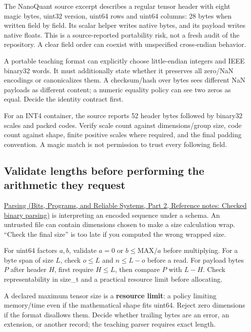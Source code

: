 The NanoQuant source excerpt describes a regular tensor header with eight magic bytes, uint32 version, uint64 rows and uint64 columns: 28 bytes when written field by field. Its scalar helper writes native bytes, and its payload writes native floats. This is a source-reported portability risk, not a fresh audit of the repository. A clear field order can coexist with unspecified cross-endian behavior.

A portable teaching format can explicitly choose little-endian integers and IEEE binary32 words. It must additionally state whether it preserves all zero/NaN encodings or canonicalizes them. A checksum/hash over bytes sees different NaN payloads as different content; a numeric equality policy can see two zeros as equal. Decide the identity contract first.

For an INT4 container, the source reports 52 header bytes followed by binary32 scales and packed codes. Verify scale count against dimensions/group size, code count against shape, finite positive scales where required, and the final padding convention. A magic match is not permission to trust every following field.

\subsection{Validate lengths before performing the arithmetic they request}\label{05-engine-i-ch002-validate-lengths-before-performing-the-arithmetic-they-request}

\hypertarget{05-engine-i-ch002-validate-lengths-before-performing-the-arithmetic-they-request}{}

\href{../01-Bits-Programs-and-Reliable-Systems-P02/main.pdf\#appendix-652d81568de9}{Parsing (Bits, Programs, and Reliable Systems, Part 2, Reference notes: Checked binary parsing)} is interpreting an encoded sequence under a schema. An untrusted file can contain dimensions chosen to make a size calculation wrap. ``Check the final size'' is too late if you computed the wrong wrapped size.

For uint64 factors \(a,b\), validate \(a=0\) or \(b\le\mathrm{MAX}/a\) before multiplying. For a byte span of size \(L\), check \(o\le L\) and \(n\le L-o\) before a read. For payload bytes \(P\) after header \(H\), first require \(H\le L\), then compare \(P\) with \(L-H\). Check representability in size\_t and a practical resource limit before allocating.

A declared maximum tensor size is a \textbf{resource limit}: a policy limiting memory/time even if the mathematical shape fits uint64. Reject zero dimensions if the format disallows them. Decide whether trailing bytes are an error, an extension, or another record; the teaching parser requires exact length.

